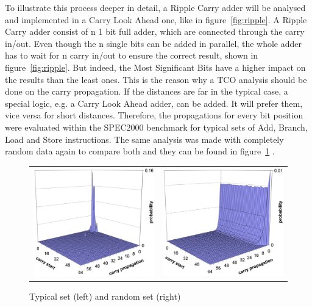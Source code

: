 \documentclass[12pt, a4paper]{article}
\begin{document}
	To illustrate this process deeper in detail, a Ripple Carry adder will be analysed and implemented in a Carry Look Ahead one\cite{austin}, like in figure~\ref{fig:ripple}. A Ripple Carry adder consist of n 1 bit full adder, which are connected through the carry in/out. Even though the n single bits can be added in parallel, the whole adder has to wait for n carry in/out to ensure the correct result, shown in figure~\ref{fig:ripple}. But indeed, the Most Significant Bits have a higher impact on the results than the least ones. This is the reason why a TCO analysis should be done on the carry propagation. If the distances are far in the typical case, a special logic, e.g. a Carry Look Ahead adder, can be added. It will prefer them, vice versa for short distances. Therefore, the propagations for every bit position were evaluated within the SPEC2000 benchmark for typical sets of Add, Branch, Load and Store instructions. The same analysis was made with completely random data again to compare both and they can be found in figure~\ref{fig:pres} .  
	\begin{figure}[ht]
		\centering
		\begin{tabular}{ll}
			\includegraphics[width=6cm]{pres.png}
			&
			\includegraphics[width=6cm]{prand.png}
		\end{tabular}
		\caption{Typical set (left) \label{fig:pres} and random set (right)\cite{austin}}
	\end{figure}%
	
\end{document}
